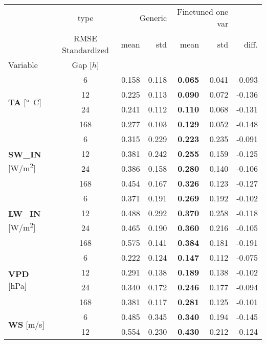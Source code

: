 \begin{table}
\centering
\begin{tabular}{p{2.1cm}c|rr|rr|r}
\toprule
 & type & \multicolumn{2}{r}{Generic} & \multicolumn{2}{r}{Finetuned one var} &  \\
 & RMSE Standardized & mean & std & mean & std & diff. \\
Variable & Gap [$h$] &  &  &  &  &  \\
\midrule
\multirow[c]{4}{*}{\parbox{2.1cm}{\textbf{TA} [\si{°C}]}} & 6 & 0.158 & 0.118 & \bfseries 0.065 & 0.041 & -0.093 \\
 & 12 & 0.225 & 0.113 & \bfseries 0.090 & 0.072 & -0.136 \\
 & 24 & 0.241 & 0.112 & \bfseries 0.110 & 0.068 & -0.131 \\
 & 168 & 0.277 & 0.103 & \bfseries 0.129 & 0.052 & -0.148 \\
\cline{1-7}
\multirow[c]{4}{*}{\parbox{2.1cm}{\textbf{SW\_IN} [\si{W/m^2}]}} & 6 & 0.315 & 0.229 & \bfseries 0.223 & 0.235 & -0.091 \\
 & 12 & 0.381 & 0.242 & \bfseries 0.255 & 0.159 & -0.125 \\
 & 24 & 0.386 & 0.158 & \bfseries 0.280 & 0.140 & -0.106 \\
 & 168 & 0.454 & 0.167 & \bfseries 0.326 & 0.123 & -0.127 \\
\cline{1-7}
\multirow[c]{4}{*}{\parbox{2.1cm}{\textbf{LW\_IN} [\si{W/m^2}]}} & 6 & 0.371 & 0.191 & \bfseries 0.269 & 0.192 & -0.102 \\
 & 12 & 0.488 & 0.292 & \bfseries 0.370 & 0.258 & -0.118 \\
 & 24 & 0.465 & 0.190 & \bfseries 0.360 & 0.216 & -0.105 \\
 & 168 & 0.575 & 0.141 & \bfseries 0.384 & 0.181 & -0.191 \\
\cline{1-7}
\multirow[c]{4}{*}{\parbox{2.1cm}{\textbf{VPD} [\si{hPa}]}} & 6 & 0.222 & 0.124 & \bfseries 0.147 & 0.112 & -0.075 \\
 & 12 & 0.291 & 0.138 & \bfseries 0.189 & 0.138 & -0.102 \\
 & 24 & 0.340 & 0.172 & \bfseries 0.246 & 0.177 & -0.094 \\
 & 168 & 0.381 & 0.117 & \bfseries 0.281 & 0.125 & -0.101 \\
\cline{1-7}
\multirow[c]{4}{*}{\parbox{2.1cm}{\textbf{WS} [\si{m/s}]}} & 6 & 0.485 & 0.345 & \bfseries 0.340 & 0.194 & -0.145 \\
 & 12 & 0.554 & 0.230 & \bfseries 0.430 & 0.212 & -0.124 \\

\end{tabular}
\end{table}
